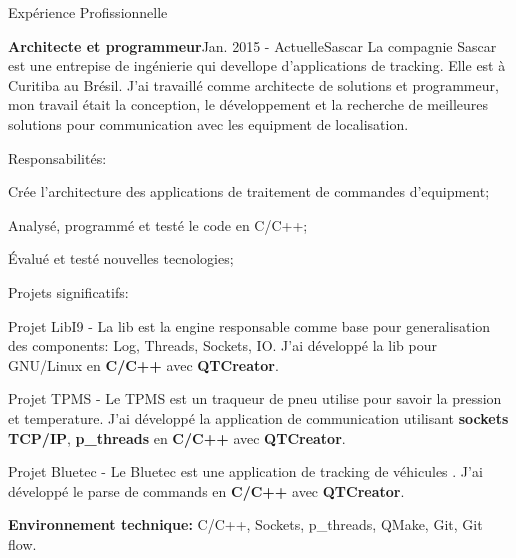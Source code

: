 \documentclass{resume}
\begin{document}
  \begin{rSection}{Expérience Profissionnelle}

    \begin{rSubsection}{\bf Architecte et programmeur}{Jan. 2015 - Actuelle}{Sascar}{}
      La compagnie Sascar est une entrepise de ingénierie qui devellope d'applications de tracking. Elle est à Curitiba au Brésil. J'ai travaillé comme architecte de solutions et programmeur, mon travail était la conception, le développement et la recherche de meilleures solutions pour communication avec les equipment de localisation.
    \end{rSubsection}
    \begin{rSubsection}{Responsabilités:}{}{}{}
      \item Crée l’architecture des applications de traitement de commandes d'equipment;
      \item Analysé, programmé et testé le code en C/C++;
      \item Évalué et testé nouvelles tecnologies;
    \end{rSubsection}
    \begin{rSubsection}{Projets significatifs:}{}{}{}
      \item Projet LibI9 - La lib est la engine responsable comme base pour generalisation des components: Log, Threads, Sockets, IO. J’ai développé la lib pour GNU/Linux en \textbf{C/C++} avec \textbf{QTCreator}. \\
      \item Projet TPMS - Le TPMS est un traqueur de pneu utilise pour savoir la pression et temperature. J’ai développé la application de communication utilisant \textbf{sockets} \textbf{TCP/IP}, \textbf{p\_threads} en \textbf{C/C++} avec \textbf{QTCreator}. \\
      \item Projet Bluetec - Le Bluetec est une application de tracking de véhicules . J’ai développé le parse de commands en \textbf{C/C++} avec \textbf{QTCreator}. \\
    \end{rSubsection}

     {\fontsize{8}{9}\selectfont \textbf{Environnement technique:} C/C++, Sockets, p\_threads, QMake, Git, Git flow.}


\end{rSection}
\end{document}
